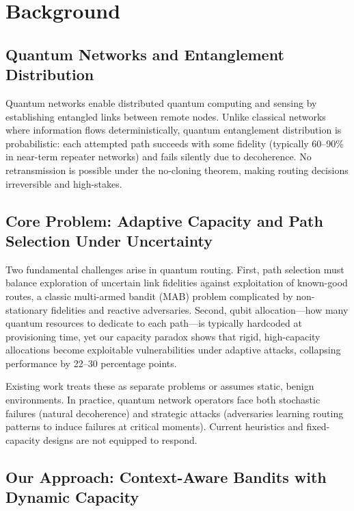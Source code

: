 \documentclass[11pt,a4paper]{article}
\begin{document}
\section{Background}
\label{sec:background}

\subsection{Quantum Networks and Entanglement Distribution}

Quantum networks enable distributed quantum computing and sensing by establishing entangled links between remote nodes. Unlike classical networks where information flows deterministically, quantum entanglement distribution is probabilistic: each attempted path succeeds with some fidelity (typically 60--90\% in near-term repeater networks) and fails silently due to decoherence. No retransmission is possible under the no-cloning theorem, making routing decisions irreversible and high-stakes.

\subsection{Core Problem: Adaptive Capacity and Path Selection Under Uncertainty}

Two fundamental challenges arise in quantum routing. First, path selection must balance exploration of uncertain link fidelities against exploitation of known-good routes, a classic multi-armed bandit (MAB) problem complicated by non-stationary fidelities and reactive adversaries. Second, qubit allocation—how many quantum resources to dedicate to each path—is typically hardcoded at provisioning time, yet our capacity paradox shows that rigid, high-capacity allocations become exploitable vulnerabilities under adaptive attacks, collapsing performance by 22--30 percentage points.

Existing work treats these as separate problems or assumes static, benign environments. In practice, quantum network operators face both stochastic failures (natural decoherence) and strategic attacks (adversaries learning routing patterns to induce failures at critical moments). Current heuristics and fixed-capacity designs are not equipped to respond.

\subsection{Our Approach: Context-Aware Bandits with Dynamic Capacity}
\end{document}
